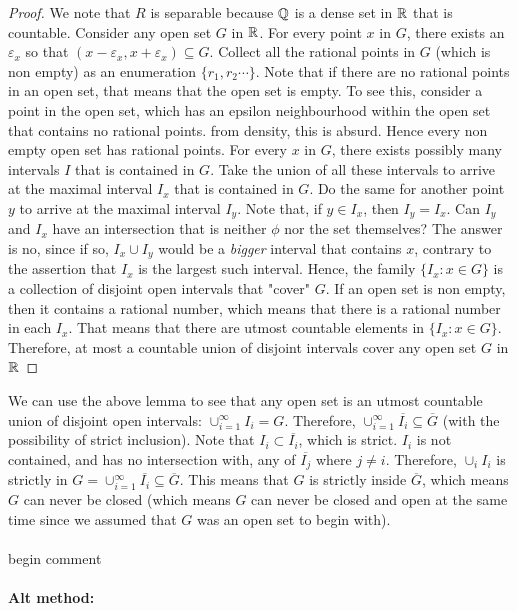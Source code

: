 \documentclass[../Main.tex]{subfiles}
\begin{document}
 \begin{proof}
    We note that $R$ is separable because $\mathbb Q$ is a dense set in $\mathbb R$ that is countable. Consider any open set $G$ in $\mathbb R$. For every point $x$ in $G$, there exists an $\varepsilon_x$ so that $(x-\varepsilon_x,x+\varepsilon_x)\subseteq G$. Collect all the rational points in $G$ (which is non empty) as an enumeration $\{r_1,r_2 \cdots\}$. Note that if there are no rational points in an open set, that means that the open set is empty. To see this, consider a point in the open set, which has an epsilon neighbourhood within the open set that contains no rational points. from density, this is absurd. Hence every non empty open set has rational points. For every $x$ in $G$, there exists possibly many intervals $I$ that is contained in $G$. Take the union of all these intervals to arrive at the maximal interval $I_x$ that is contained in $G$. Do the same for another point $y$ to arrive at the maximal interval $I_y$. Note that, if $y \in I_x$, then $I_y=I_x$. Can $I_y$ and $I_x$ have an intersection that is neither $\phi$ nor the set themselves? The answer is no, since if so, $I_x \cup I_y$ would be a \emph{bigger} interval that contains $x$, contrary to the assertion that $I_x$ is the largest such interval. Hence, the family $\{I_x: x \in G\}$ is a collection of disjoint open intervals that "cover" $G$. If an open set is non empty, then it contains a rational number, which means that there is a rational number in each $I_x$. That means that there are utmost countable elements in $\{I_x: x \in G\}$. Therefore, at most a countable union of disjoint intervals cover any open set $G$ in $\mathbb R$
 \end{proof} 
 We can use the above lemma to see that any open set is an utmost countable union of disjoint open intervals: $\cup_{i=1}^{\infty}I_i=G$. Therefore, $\cup_{i=1}^{\infty}\overline{I_i}\subseteq \overline{G}$ (with the possibility of strict inclusion). Note that $I_i \subset \overline{I_i}$, which is strict. $I_i$ is not contained, and has no intersection with, any of $\overline{I_j}$ where $j \neq i$. Therefore, $\cup_{i}I_i$ is strictly in $G=\cup_{i=1}^{\infty} \overline{I_i} \subseteq \overline{G}$.
 This means that $G$ is strictly inside $\overline{G}$, which means $G$ can never be closed (which means $G$ can never be closed and open at the same time since we assumed that $G$ was an open set to begin with). 
\\\\ begin comment
\\\\ \textbf{Alt method: }
\end{document}
